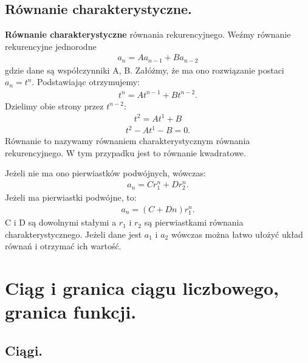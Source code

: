 \documentclass[12pt]{article}
\begin{document}
    \subsection{Równanie charakterystyczne.}
    \begin{definition}
        \textbf{Równanie charakterystyczne} równania rekurencyjnego. Weźmy równanie rekurencyjne jednorodne
        \begin{align*}
            a_n = A a_{n-1} + B a_{n-2}
        \end{align*}
        gdzie dane są współczynniki A, B. Załóżmy, że ma ono rozwiązanie postaci $a_n = t^n$. Podstawiając otrzymujemy:
        \begin{align*}
            t^n = A t^{n-1} + B t^{n-2}.
        \end{align*}
        Dzielimy obie strony przez $t^{n-2}$:
        \begin{align*}
            t^2 = A t^1 + B
        \end{align*}
        \begin{align*}
            t^2 - A t^1 - B = 0.
        \end{align*}
        Równanie to nazywamy równaniem charakterystycznym równania rekurencyjnego. W tym przypadku jest to równanie kwadratowe.

        Jeżeli nie ma ono pierwiastków podwójnych, wówczas:
        \begin{align*}
            a_n = C r_1^n + D r_2^n.
        \end{align*}
        Jeżeli ma pierwiastki podwójne, to:
        \begin{align*}
            a_n = (C + Dn) r_1^n.
        \end{align*}
        C i D są dowolnymi stałymi a $r_{1}$ i $r_{2}$ są pierwiastkami równania charakterystycznego. Jeżeli dane jest
        $a_{1}$ i $a_{2}$ wówczas można łatwo ułożyć układ równań i otrzymać ich wartość.
    \end{definition}

    \newpage

    \section{Ciąg i granica ciągu liczbowego, granica funkcji.}

    \subsection{Ciągi.}
\end{document}
